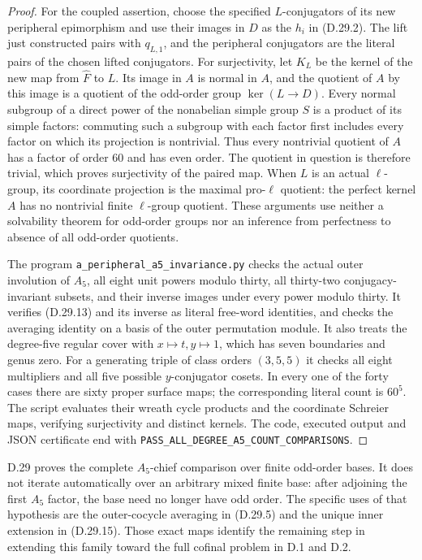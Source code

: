 \begin{proof}
For the coupled assertion, choose the specified
$L$-conjugators of its new peripheral epimorphism
and use their images in $D$ as the $h_i$ in
\textup{(D.29.2)}.  The lift just constructed
pairs with $q_{L,1}$, and
the peripheral conjugators are the literal
pairs of the chosen lifted conjugators.
For surjectivity, let $K_L$ be the kernel of the
new map from $\widehat F$ to $L$.  Its image in $A$
is normal in $A$, and the quotient of $A$ by this
image is a quotient of the odd-order group
$\ker(L\to D)$.  Every normal subgroup of a direct
power of the nonabelian simple group $S$ is a
product of its simple factors: commuting such a
subgroup with each factor first includes every
factor on which its projection is nontrivial.
Thus every nontrivial quotient of $A$ has a
factor of order $60$ and has even order.
The quotient in question is therefore trivial,
which proves surjectivity of the paired map.
When $L$ is an actual $\ell$-group, its coordinate
projection is the maximal pro-$\ell$ quotient:
the perfect kernel $A$ has no nontrivial finite
$\ell$-group quotient.  These arguments use
neither a solvability theorem for odd-order
groups nor an inference from perfectness to
absence of all odd-order quotients.

The program \texttt{a\_peripheral\_a5\_invariance.py}
checks the actual outer involution of $A_5$,
all eight unit powers modulo thirty, all
thirty-two conjugacy-invariant subsets, and
their inverse images under every power modulo thirty.
It verifies \textup{(D.29.13)} and its inverse
as literal free-word identities, and checks
the averaging identity on a basis of the
outer permutation module.
It also treats the degree-five regular cover
with $x\mapsto t,y\mapsto1$, which has seven
boundaries and genus zero.  For a generating
triple of class orders $(3,5,5)$ it checks
all eight multipliers and all five possible
$y$-conjugator cosets.  In every one of the
forty cases there are sixty proper surface
maps; the corresponding literal count is
$60^5$.  The script evaluates their wreath
cycle products and the coordinate Schreier
maps, verifying surjectivity and distinct
kernels.  The code, executed output and
JSON certificate end with
\texttt{PASS\_ALL\_DEGREE\_A5\_COUNT\_COMPARISONS}.
\end{proof}

D.29 proves the complete $A_5$-chief comparison
over finite odd-order bases.  It does not
iterate automatically over an arbitrary
mixed finite base: after adjoining the
first $A_5$ factor, the base need no longer
have odd order.  The specific uses of
that hypothesis are the outer-cocycle
averaging in \textup{(D.29.5)} and the
unique inner extension in
\textup{(D.29.15)}.  Those exact maps
identify the remaining step in extending
this family toward the full cofinal
problem in D.1 and D.2.
